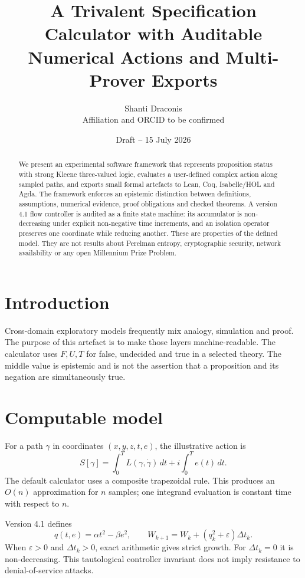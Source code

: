\documentclass[11pt]{article}
\title{A Trivalent Specification Calculator with Auditable Numerical Actions and Multi-Prover Exports}
\author{Shanti Draconis\\\small Affiliation and ORCID to be confirmed}
\date{Draft -- 15 July 2026}
\begin{document}
\maketitle
\begin{abstract}
We present an experimental software framework that represents proposition
status with strong Kleene three-valued logic, evaluates a user-defined complex
action along sampled paths, and exports small formal artefacts to Lean, Coq,
Isabelle/HOL and Agda. The framework enforces an epistemic distinction between
definitions, assumptions, numerical evidence, proof obligations and checked
theorems. A version 4.1 flow controller is audited as a finite state machine:
its accumulator is non-decreasing under explicit non-negative time increments,
and an isolation operator preserves one coordinate while reducing another.
These are properties of the defined model. They are not results about
Perelman entropy, cryptographic security, network availability or any open
Millennium Prize Problem.
\end{abstract}

\section{Introduction}
Cross-domain exploratory models frequently mix analogy, simulation and proof.
The purpose of this artefact is to make those layers machine-readable. The
calculator uses $F,U,T$ for false, undecided and true in a selected theory. The
middle value is epistemic and is not the assertion that a proposition and its
negation are simultaneously true.

\section{Computable model}
For a path $\gamma$ in coordinates $(x,y,z,t,e)$, the illustrative action is
\begin{equation}
S[\gamma]=\int_0^T L(\gamma,\dot\gamma)\,dt+i\int_0^T e(t)\,dt.
\end{equation}
The default calculator uses a composite trapezoidal rule. This produces an
$O(n)$ approximation for $n$ samples; one integrand evaluation is constant
time with respect to $n$.

Version 4.1 defines
\begin{equation}
q(t,e)=\alpha t^2-\beta e^2,\qquad
W_{k+1}=W_k+(q_k^2+\varepsilon)\Delta t_k.
\end{equation}
When $\varepsilon>0$ and $\Delta t_k>0$, exact arithmetic gives strict growth.
For $\Delta t_k=0$ it is non-decreasing. This tautological controller invariant
does not imply resistance to denial-of-service attacks.
\end{document}

